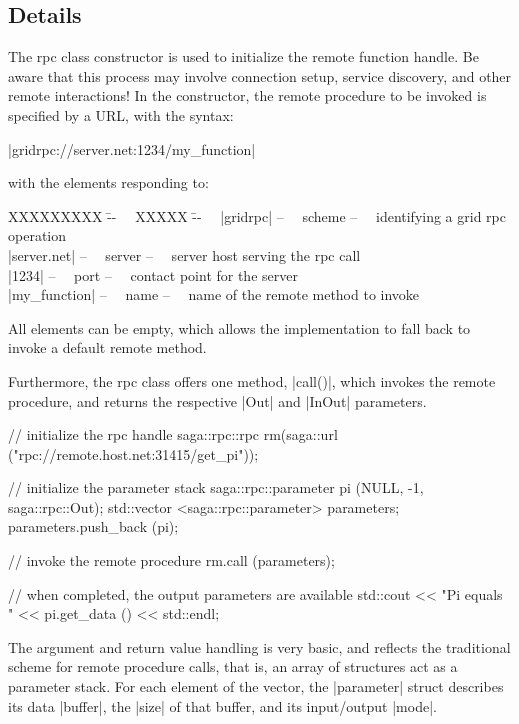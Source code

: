 \subsection{Details}

  The rpc class constructor is used to initialize the remote
  function handle.  Be aware that this process may involve
  connection setup, service discovery, and other remote
  interactions!  In the constructor, the remote procedure to be
  invoked is specified by a URL, with the syntax:

    \shift |gridrpc://server.net:1234/my_function|

  with the elements responding to:

  \begin{tabbing}
    \shift XXXXXXXXX     \= --~~ XXXXX  \= --~~ \kill
    \shift |gridrpc|     \> --~~ scheme \> --~~ identifying a grid rpc operation\\
    \shift |server.net|  \> --~~ server \> --~~ server host serving the rpc call\\
    \shift |1234|        \> --~~ port   \> --~~ contact point for the server\\
    \shift |my_function| \> --~~ name   \> --~~ name of the remote method to invoke
  \end{tabbing}
  
  All elements can be empty, which allows the implementation to
  fall back to invoke a default remote method.
  
  Furthermore, the rpc class offers one method, |call()|, which
  invokes the remote procedure, and returns the respective |Out|
  and |InOut| parameters.

  \begin{mycode}[label=Remote Procedure Call Example]
  {
    // initialize the rpc handle
    saga::rpc::rpc rm(saga::url ("rpc://remote.host.net:31415/get_pi"));

    // initialize the parameter stack
    saga::rpc::parameter pi (NULL, -1, saga::rpc::Out);
    std::vector <saga::rpc::parameter> parameters;
    parameters.push_back (pi);

    // invoke the remote procedure
    rm.call (parameters);

    // when completed, the output parameters are available
    std::cout << "Pi equals " << pi.get_data () << std::endl;
  }
  \end{mycode}
  
  The argument and return value handling is very basic, and
  reflects the traditional scheme for remote procedure calls,
  that is, an array of structures act as a parameter stack. For
  each element of the vector, the |parameter| struct describes
  its data |buffer|, the |size| of that buffer, and its
  input/output |mode|.
  
